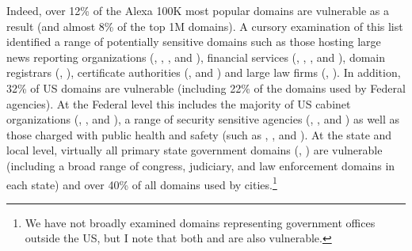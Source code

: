 Indeed, over 12\% of the Alexa 100K
most popular domains are vulnerable as a result (and almost 8\% of the
top 1M domains).  A cursory examination of this list identified a
range of potentially sensitive domains such as those hosting large
news reporting organizations (\eg, ,
,
and ),
financial services (\eg,
, ,
and ),
domain registrars (\eg, ),
certificate authorities (\eg,
 and ) and large law firms (\eg,
).  In addition, 32\% of US  domains are
vulnerable (including 22\% of the domains used by Federal
agencies).  At the Federal level this includes the majority of US
cabinet organizations (\eg, ,  and
), a range of security sensitive agencies (\eg,
,  and ) as well
as those charged with public health and safety (such as
, , and ).
At the state and local
level, virtually all primary state government domains (\eg, )
  are vulnerable (including a broad range of congress, judiciary,
  and law enforcement domains in each state) and over 40\% of all 
  domains used by cities.\footnote{We have not broadly examined domains representing government offices outside the US, but I note that both  and  are also vulnerable.}




